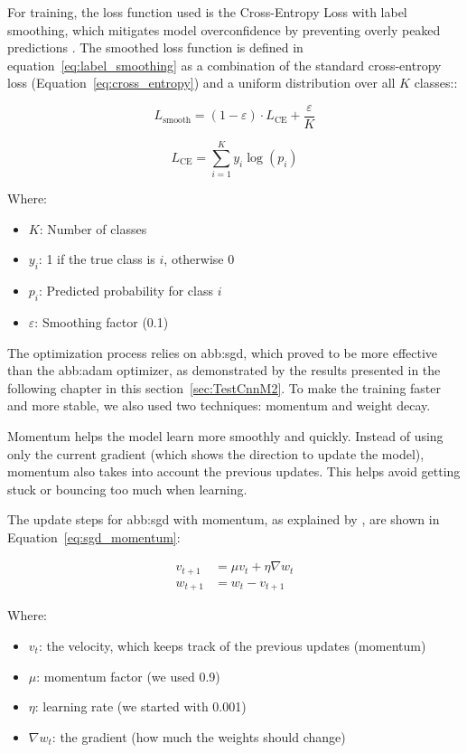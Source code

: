 For training, the loss function used is the Cross-Entropy Loss with label smoothing, which mitigates model overconfidence by preventing overly peaked predictions \parencite{szegedy2016rethinking}. The smoothed loss function is defined in equation~\ref{eq:label_smoothing} as a combination of the standard cross-entropy loss (Equation~\ref{eq:cross_entropy}) and a uniform distribution over all $K$ classes::

\begin{equation}
L_{\text{smooth}} = (1 - \varepsilon) \cdot L_{\text{CE}} + \frac{\varepsilon}{K}
\label{eq:label_smoothing}
\end{equation}

\begin{equation}
L_{\text{CE}} = \sum_{i=1}^{K} y_i \log(p_i)
\label{eq:cross_entropy}
\end{equation}

Where:
\begin{itemize}
  \item $K$: Number of classes
  \item $y_i$: 1 if the true class is $i$, otherwise 0
  \item $p_i$: Predicted probability for class $i$
  \item $\varepsilon$: Smoothing factor (0.1)
\end{itemize}


The optimization process relies on \gls{abb:sgd}, which proved to be more effective than the \gls{abb:adam} optimizer, as demonstrated by the results presented in the following chapter in this section~\ref{sec:TestCnnM2}. To make the training faster and more stable, we also used two techniques: momentum and weight decay.

Momentum helps the model learn more smoothly and quickly. Instead of using only the current gradient (which shows the direction to update the model), momentum also takes into account the previous updates. This helps avoid getting stuck or bouncing too much when learning.

The update steps for \gls{abb:sgd} with momentum, as explained by \parencite{loshchilov2016sgdr}, are shown in Equation~\ref{eq:sgd_momentum}:

\begin{align}
v_{t+1} &= \mu v_t + \eta \nabla w_t \\
w_{t+1} &= w_t - v_{t+1}
\label{eq:sgd_momentum}
\end{align}

Where:  
\begin{itemize}
  \item \( v_t \): the velocity, which keeps track of the previous updates (momentum)
  \item \( \mu \): momentum factor (we used 0.9)
  \item \( \eta \): learning rate (we started with 0.001)
  \item \( \nabla w_t \): the gradient (how much the weights should change)
\end{itemize}


